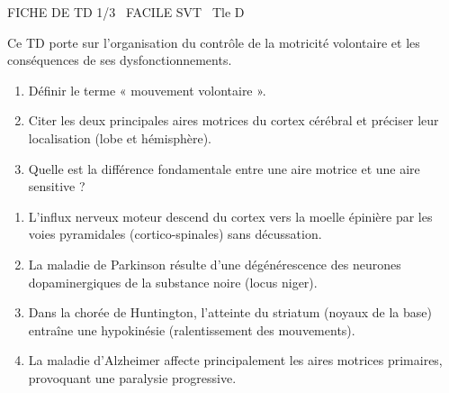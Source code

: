 \documentclass[11pt]{article}
\begin{document}
\begin{tcolorbox}[enhanced,colback=popink,colframe=popink,arc=10pt,boxrule=0pt,left=12pt,right=12pt,top=9pt,bottom=9pt]
{\color{white}\popxbold\small FICHE DE TD 1/3 \textbullet\ FACILE \hfill SVT \textbullet\ Tle D\par}
\end{tcolorbox}
\vspace{4pt}
Ce TD porte sur l'organisation du contrôle de la motricité volontaire et les conséquences de ses dysfonctionnements.

\begin{exercice}
\begin{enumerate}
    \item Définir le terme « mouvement volontaire ».
    \item Citer les deux principales aires motrices du cortex cérébral et préciser leur localisation (lobe et hémisphère).
    \item Quelle est la différence fondamentale entre une aire motrice et une aire sensitive ?
\end{enumerate}
\end{exercice}

\begin{exercice}
\begin{enumerate}
    \item L'influx nerveux moteur descend du cortex vers la moelle épinière par les voies pyramidales (cortico-spinales) sans décussation.
    \item La maladie de Parkinson résulte d'une dégénérescence des neurones dopaminergiques de la substance noire (locus niger).
    \item Dans la chorée de Huntington, l'atteinte du striatum (noyaux de la base) entraîne une hypokinésie (ralentissement des mouvements).
    \item La maladie d'Alzheimer affecte principalement les aires motrices primaires, provoquant une paralysie progressive.
\end{enumerate}
\end{exercice}
\end{document}
